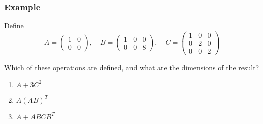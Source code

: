 \begin{frame}
\frametitle{Example}

Define 
\begin{equation*}
A = 
\begin{pmatrix}
1 & 0 \\ 0 & 0 
\end{pmatrix} 
, \quad 
B = 
\begin{pmatrix}
1 & 0  & 0 \\ 0 & 0 & 8   
\end{pmatrix} 
, \quad 
C = 
\begin{pmatrix}
1 & 0 & 0 \\ 0 & 2 & 0  \\ 0 & 0 & 2 
\end{pmatrix} 
\end{equation*}

Which of these operations are defined, and what are the dimensions of the result? 

\begin{enumerate} \setlength\itemsep{1.5em}

    \item $A + 3 C^2$ 
    \item $A(AB)^T$ 
    \item $A + A B C B^T$ 

\end{enumerate}

\end{frame}


